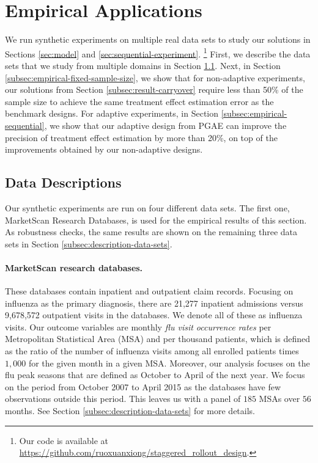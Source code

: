 \section{Empirical Applications}\label{sec:empirical}

We run synthetic experiments on multiple real data sets to study our solutions in Sections \ref{sec:model} and \ref{sec:sequential-experiment}.
\footnote{Our code is available at \protect\url{https://github.com/ruoxuanxiong/staggered_rollout_design}.}
  First, we describe the data sets that we study from multiple domains in Section \ref{subsec:data-description}.
Next, in Section \ref{subsec:empirical-fixed-sample-size}, we show that for non-adaptive experiments, our solutions from Section \ref{subsec:result-carryover} require less than 50\% of the sample size to achieve the same treatment effect estimation error as the benchmark designs. For adaptive experiments, in Section \ref{subsec:empirical-sequential}, we show that our adaptive design from PGAE can improve the precision of treatment effect estimation by more than 20\%, on top of the improvements obtained by our non-adaptive designs. 

\subsection{Data Descriptions}\label{subsec:data-description}
Our synthetic experiments are run on four different data sets. The first one, MarketScan Research Databases, is used for the empirical results of this section. As robustness checks, the same results are shown on the remaining three data sets in Section \ref{subsec:description-data-sets}.

\paragraph{MarketScan research databases.} 
These databases contain inpatient and outpatient claim records. Focusing on influenza as the primary diagnosis, there are 21,277 inpatient admissions versus 9,678,572 outpatient visits in the databases. We denote all of these as influenza visits. Our outcome variables are monthly \emph{flu visit occurrence rates} per Metropolitan Statistical Area (MSA) and per thousand patients, which is defined as the ratio of the number of influenza visits among all enrolled patients times $1,000$ for the given month in a given MSA. Moreover, our analysis focuses on the flu peak seasons that are defined as October to April of the next year. We focus on the period from October 2007 to April 2015 as the databases have few observations outside this period. This leaves us with a panel of $185$ MSAs over $56$ months.
See Section \ref{subsec:description-data-sets} for more details.



